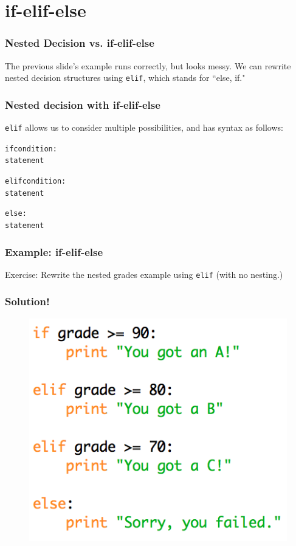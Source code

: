 \documentclass{beamer}
\begin{document}
\section{if-elif-else}

\begin{frame}[fragile]
\frametitle{Nested Decision vs. if-elif-else}

The previous slide's example runs correctly, but looks messy. We can rewrite nested decision structures using \verb|elif|, which stands for ``else, if."
\end{frame}


\begin{frame}[fragile]
\frametitle{Nested decision with if-elif-else}

\verb|elif| allows us to consider multiple possibilities, and has syntax as follows:

\begin{alltt}
if condition:
    statement
    
elif condition:
    statement
    
else:
    statement
\end{alltt}
\end{frame}


\begin{frame}[fragile]
\frametitle{Example: if-elif-else} 

Exercise: Rewrite the nested grades example using \verb|elif| (with no nesting.)
\end{frame}


\begin{frame}
\frametitle{Solution!}

\begin{figure}
\centering
\includegraphics[scale=0.8]{IMG/elif_grade.png}
\end{figure}
\end{frame}
\end{document}
